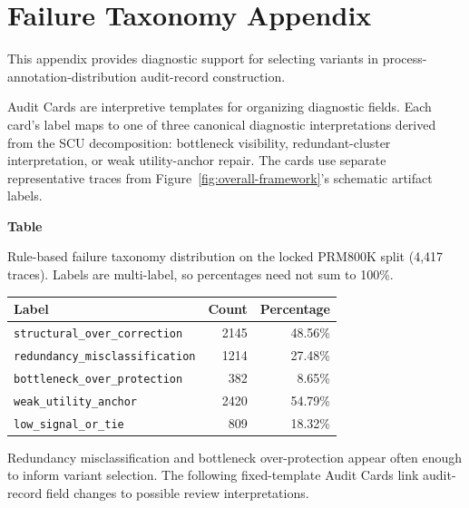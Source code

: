 \documentclass[a4paper,fleqn]{cas-sc}
\begin{document}
\clearpage
\appendix

\section{Failure Taxonomy Appendix}
\label{app:failure-taxonomy}

This appendix provides diagnostic support for selecting variants in process-annotation-distribution audit-record construction.

Audit Cards are interpretive templates for organizing diagnostic fields. Each card's label maps to one of three canonical diagnostic interpretations derived from the SCU decomposition: bottleneck visibility, redundant-cluster interpretation, or weak utility-anchor repair. The cards use separate representative traces from Figure~\ref{fig:overall-framework}'s schematic artifact labels.

\par\medskip
{}\label{tab:failure-taxonomy}
\noindent\textbf{Table~\thetable}\par
\noindent Rule-based failure taxonomy distribution on the locked PRM800K split (4,417 traces). Labels are multi-label, so percentages need not sum to 100\%.
\begin{center}
\small
\renewcommand{\arraystretch}{1.08}
\begin{tabular}{lrr}
\toprule
\textbf{Label} & \textbf{Count} & \textbf{Percentage} \\
\midrule
\texttt{structural\_over\_correction} & 2145 & 48.56\% \\
\texttt{redundancy\_misclassification} & 1214 & 27.48\% \\
\texttt{bottleneck\_over\_protection} & 382 & 8.65\% \\
\texttt{weak\_utility\_anchor} & 2420 & 54.79\% \\
\texttt{low\_signal\_or\_tie} & 809 & 18.32\% \\
\bottomrule
\end{tabular}
\end{center}
\medskip

Redundancy misclassification and bottleneck over-protection appear often enough to inform variant selection. The following fixed-template Audit Cards link audit-record field changes to possible review interpretations.
\end{document}
